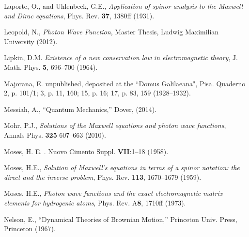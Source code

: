 \documentclass[11pt]{article}
\theoremstyle{definition}
\numberwithin{equation}{section}
\begin{document}
\begin{thebibliography}{[KTZ2020]}
  Laporte, O., 
and 
Uhlenbeck, G.E.,
 \textit{Application of spinor analysis to the Maxwell and Dirac equations},
 Phys. Rev. \textbf{37}, 1380ff (1931).\vspace{-4pt}

  Leopold, N.,
  \textit{Photon Wave Function},
  Master Thesis,  Ludwig Maximilian University (2012).\vspace{-4pt}

  Lipkin, D.M.
  \textit{Existence of a new conservation law in electromagnetic theory},
  J. Math. Phys. \textbf{5}, 696--700 (1964).\vspace{-4pt}

Majorana, E.
\newblock unpublished, deposited at the ``Domus Galilaeana", Pisa.
\newblock Quaderno 2, p. 101/1; 3, p. 11, 160; 15, p. 16; 17, p. 83, 159 (1928--1932).\vspace{-4pt}

  Messiah, A.,
  ``Quantum Mechanics,'' Dover, (2014). \vspace{-4pt}

  Mohr, P.J.,
      \textit{Solutions of the Maxwell equations and photon wave functions},
  Annals Phys. \textbf{325} 607--663 (2010). \vspace{-4pt}

Moses, H. E.
.
\newblock Nuovo Cimento Suppl. {\bf VII}:1--18 (1958).\vspace{-4pt}

  Moses, H.E.,
  \textit{Solution of Maxwell's equations in terms of a spinor notation: the direct and the inverse problem},
  Phys. Rev. \textbf{113}, 1670--1679 (1959).\vspace{-4pt}

  Moses, H.E.,
  \textit{Photon wave functions and the exact electromagnetic matrix elements for hydrogenic atoms}, 
  Phys. Rev. A\textbf{8}, 1710ff (1973).\vspace{-4pt}

        Nelson, E.,
                ``{Dynamical Theories of Brownian Motion},''
        Princeton Univ. Press, Princeton (1967).\vspace{-4pt}


\end{thebibliography}
\end{document}
